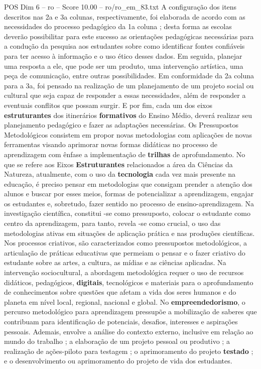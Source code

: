 \begin{textsample}{POS Dim 6 – ro – Score 10.00 – ro/ro\_em\_83.txt}
A configuração dos itens descritos nas 2a e 3a colunas, respectivamente, foi elaborada de acordo com as necessidades do processo pedagógico da 1a coluna ; desta forma as escolas deverão possibilitar para este sucesso as orientações pedagógicas necessárias para a condução da pesquisa aos estudantes sobre como identificar fontes confiáveis para ter acesso à informação e o uso ético desses dados.
Em seguida, planejar uma resposta a ele, que pode ser um produto, uma intervenção artística, uma peça de comunicação, entre outras possibilidades.
Em conformidade da 2a coluna para a 3a, foi pensado na realização de um planejamento de um projeto social ou cultural que seja capaz de responder a essas necessidades, além de responder a eventuais conflitos que possam surgir.
E por fim, cada um dos eixos \textbf{estruturantes} dos itinerários \textbf{formativos} do Ensino Médio, deverá realizar seu planejamento pedagógico e fazer as adaptações necessárias.
Os Pressupostos Metodológicos consistem em propor novas metodologias com aplicações de novas ferramentas visando aprimorar novas formas didáticas no processo de aprendizagem com ênfase a implementação de \textbf{trilhas} de aprofundamento.
No que se refere aos Eixos \textbf{Estruturantes} relacionados a área da Ciências da Natureza, atualmente, com o uso da \textbf{tecnologia} cada vez mais presente na educação, é preciso pensar em metodologias que consigam prender a atenção dos alunos e buscar por esses meios, formas de potencializar a aprendizagem, engajar os estudantes e, sobretudo, fazer sentido no processo de ensino-aprendizagem.
Na investigação científica, constitui -se como pressuposto, colocar o estudante como centro da aprendizagem, para tanto, revela -se como crucial, o uso das metodologias ativas em situações de aplicação prática e nas produções científicas.
Nos processos criativos, são caracterizados como pressupostos metodológicos, a articulação de práticas educativas que permeiam o pensar e o fazer criativo do estudante sobre as artes, a cultura, as mídias e as ciências aplicadas.
Na intervenção sociocultural, a abordagem metodológica requer o uso de recursos didáticos, pedagógicos, \textbf{digitais}, tecnológicos e materiais para o aprofundamento de conhecimentos sobre questões que afetam a vida dos seres humanos e do planeta em nível local, regional, nacional e global.
No \textbf{empreendedorismo}, o percurso metodológico para aprendizagem pressupõe a mobilização de saberes que contribuam para identificação de potenciais, desafios, interesses e aspirações pessoais.
Ademais, envolve a análise do contexto externo, inclusive em relação ao mundo do trabalho ; a elaboração de um projeto pessoal ou produtivo ; a realização de ações-piloto para testagem ; o aprimoramento do projeto \textbf{testado} ; e o desenvolvimento ou aprimoramento do projeto de vida dos estudantes.

\end{textsample}
